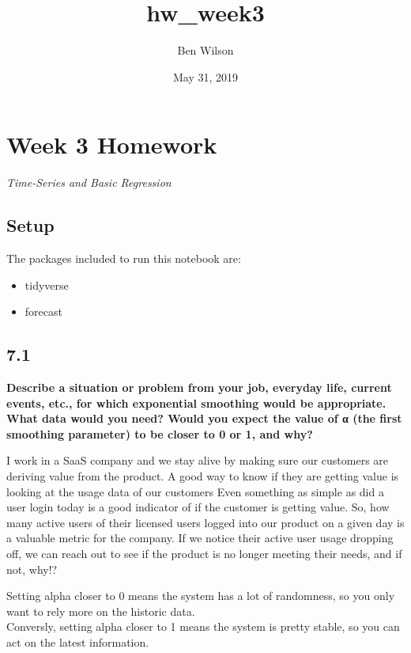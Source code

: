 \documentclass[]{article}
\title{hw\_week3}
\author{Ben Wilson}
\date{May 31, 2019}
\providecommand{\tightlist}{%
  \setlength{\itemsep}{0pt}\setlength{\parskip}{0pt}}
\begin{document}
\maketitle

\section{Week 3 Homework}\label{week-3-homework}

\emph{Time-Series and Basic Regression}

\subsection{Setup}\label{setup}

The packages included to run this notebook are:

\begin{itemize}
\tightlist
\item
  tidyverse
\item
  forecast
\end{itemize}

\subsection{7.1}\label{section}

\textbf{Describe a situation or problem from your job, everyday life,
current events, etc., for which exponential smoothing would be
appropriate. What data would you need? Would you expect the value of α
(the first smoothing parameter) to be closer to 0 or 1, and why?}

I work in a SaaS company and we stay alive by making sure our customers
are deriving value from the product. A good way to know if they are
getting value is looking at the usage data of our customers Even
something as simple as did a user login today is a good indicator of if
the customer is getting value. So, how many active users of their
licensed users logged into our product on a given day is a valuable
metric for the company. If we notice their active user usage dropping
off, we can reach out to see if the product is no longer meeting their
needs, and if not, why!?

Setting alpha closer to 0 means the system has a lot of randomness, so
you only want to rely more on the historic data.\\
Conversly, setting alpha closer to 1 means the system is pretty stable,
so you can act on the latest information.
\end{document}
